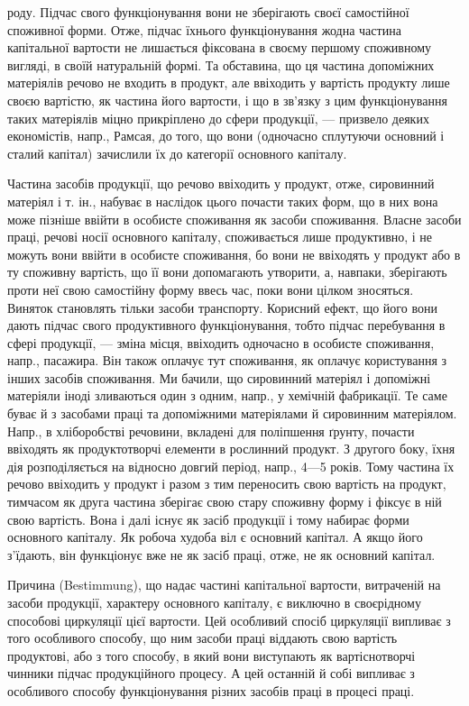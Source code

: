 \parcont{}  %
роду. Підчас свого функціонування вони не зберігають своєї самостійної
споживної форми. Отже, підчас їхнього функціонування жодна частина
капітальної вартости не лишається фіксована в своєму першому споживному
вигляді, в своїй натуральній формі. Та обставина, що ця частина
допоміжних матеріялів речово не входить в продукт, але ввіходить у
вартість продукту лише своєю вартістю, як частина його вартости, і що
в зв’язку з цим функціонування таких матеріялів міцно прикріплено до
сфери продукції, — призвело деяких економістів, напр., Рамсая, до того,
що вони (одночасно сплутуючи основний і сталий капітал) зачислили їх
до категорії основного капіталу.

Частина засобів продукції, що речово ввіходить у продукт, отже,
сировинний матеріял і т. ін., набуває в наслідок цього почасти таких
форм, що в них вона може пізніше ввійти в особисте споживання як
засоби споживання. Власне засоби праці, речові носії основного капіталу,
споживається лише продуктивно, і не можуть вони ввійти в особисте
споживання, бо вони не ввіходять у продукт або в ту споживну вартість,
що її вони допомагають утворити, а, навпаки, зберігають проти
неї свою самостійну форму ввесь час, поки вони цілком зносяться. Виняток
становлять тільки засоби транспорту. Корисний ефект, що його
вони дають підчас свого продуктивного функціонування, тобто підчас
перебування в сфері продукції, — зміна місця, ввіходить одночасно в особисте
споживання, напр., пасажира. Він також оплачує тут споживання,
як оплачує користування з інших засобів споживання. Ми бачили, що
сировинний матеріял і допоміжні матеріяли іноді зливаються один з
одним, напр., у хемічній фабрикації. Те саме буває й з засобами праці
та допоміжними матеріялами й сировинним матеріялом. Напр., в хліборобстві
речовини, вкладені для поліпшення ґрунту, почасти ввіходять як продуктотворчі
елементи в рослинний продукт. З другого боку, їхня дія
розподіляється на відносно довгий період, напр., 4—5 років. Тому частина
їх речово ввіходить у продукт і разом з тим переносить свою
вартість на продукт, тимчасом як друга частина зберігає свою стару
споживну форму і фіксує в ній свою вартість. Вона і далі існує як засіб
продукції і тому набирає форми основного капіталу. Як робоча худоба
віл є основний капітал. А якщо його з’їдають, він функціонує вже не як
засіб праці, отже, не як основний капітал.

Причина (Bestimmung), що надає частині капітальної вартости, витраченій
на засоби продукції, характеру основного капіталу, є виключно в
своєрідному способові циркуляції цієї вартости. Цей особливий спосіб
циркуляції випливає з того особливого способу, що ним засоби праці
віддають свою вартість продуктові, або з того способу, в який вони виступають
як вартіснотворчі чинники підчас продукційного процесу. А цей останній
й собі випливає з особливого способу функціонування різних засобів
праці в процесі праці.

